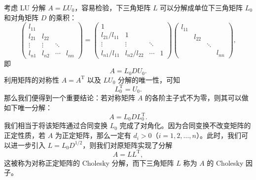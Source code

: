 考虑 LU 分解 $A=LU_0$，容易检验，下三角矩阵 $L$ 可以分解成单位下三角矩阵 $L_0$ 和对角矩阵 $D$ 的乘积：
\begin{equation}
\begin{pmatrix}
l_{11}&&&\\
l_{21}&l_{22}&&\\
\vdots&\vdots&\ddots&\\
l_{n1}&l_{n2}&\cdots&l_{nn}
\end{pmatrix}
=
\begin{pmatrix}
1&&&\\
l_{21}/l_{11}&1&&\\
\vdots&\vdots&\ddots&\\
l_{n1}/l_{11}&l_{n2}/l_{22}&\cdots&1
\end{pmatrix}
\begin{pmatrix}
l_{11}&&&\\&l_{22}&&\\&&\ddots&\\&&&l_{nn}
\end{pmatrix},
\tag{3.1.18}
\end{equation}
即
\begin{equation}
A=L_0DU_0.
\tag{3.1.19}
\end{equation}
利用矩阵的对称性 $A=A^{\mathrm T}$ 以及 $LU_0$ 分解的唯一性，可知
\begin{equation}
L_0^{\mathrm T}=U_0.
\tag{3.1.20}
\end{equation}
那么我们便得到一个重要结论：若对称矩阵 $A$ 的各阶主子式不为零，则其可以做如下唯一分解：
\begin{equation}
A=L_0DL_0^{\mathrm T}.
\tag{3.1.21}
\end{equation}
我们相当于将该矩阵通过合同变换 $L_0$ 完成了对角化。因为合同变换不改变矩阵的正定性质，若 $A$ 为正定矩阵，那么一定有 $d_i>0$（$i=1,2,\ldots,n$）。此时，我们可以进一步引入 $L=L_0D^{1/2}$，则我们对原矩阵实现了分解
\begin{equation}
A=LL^{\mathrm T},
\tag{3.1.22}
\end{equation}
这被称为对称正定矩阵的 Cholesky 分解，而下三角矩阵 $L$ 称为 $A$ 的 Cholesky 因子。


